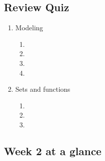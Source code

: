 \newpage
\subsection*{Review Quiz}
\begin{enumerate}
\item Modeling
\begin{enumerate}
    \item {}
    \item {}
    \item {}
    \item {}
\end{enumerate}
\item Sets and functions
\begin{enumerate}
    \item {}
    \item {}
    \item {}
\end{enumerate}

\end{enumerate}

\newpage

\subsection*{Week 2 at a glance}

